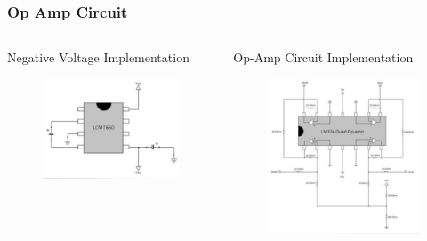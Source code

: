 \documentclass{beamer}
\begin{document}
\begin{frame}
	\frametitle{Op Amp Circuit}
	\begin{columns}[T]
		\begin{column}{0.5\textwidth}
			\begin{block}{Negative Voltage Implementation}
				\begin{figure}
					\centering 
					\includegraphics[scale=.7]{figures/ckt1.pdf} 
				\end{figure}
			\end{block}
		\end{column}		
		\begin{column}{0.5\textwidth}
			\begin{block}{Op-Amp Circuit Implementation}
				\begin{figure}
					\centering
					\includegraphics[scale=.7]{figures/ckt2.pdf}
				\end{figure}
			\end{block}	
		\end{column}
	\end{columns}						
\end{frame}
\end{document}
